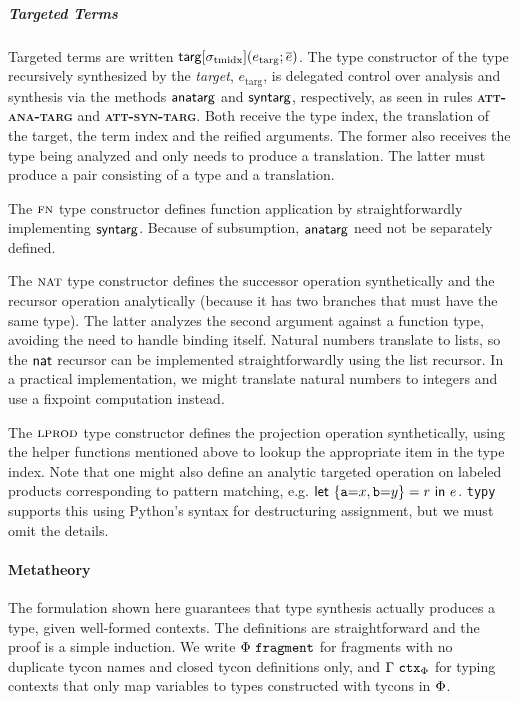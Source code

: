 \documentclass[preprint,10pt]{sigplanconf}
\newcommand{\sigmat}[1]{\sigma_{\text{#1}}}
\newcommand{\FF}[1]{{\sf #1}}
\newcommand{\rulename}[1]{{\textsc{\textbf{#1}}}}
\begin{document}
\subparagraph{Targeted Terms} Targeted terms are written $\FF{targ}[\sigmat{tmidx}](e_\text{targ}; \overline{e})$. The type constructor of the type recursively synthesized by the \emph{target}, $e_\text{targ}$, is delegated control over analysis and synthesis via the methods $\FF{anatarg}$ and $\FF{syntarg}$, respectively, as seen in rules \rulename{att-ana-targ} and \rulename{att-syn-targ}. Both receive the type index, the translation of the target, the term index and the reified arguments. The former also receives the type being analyzed and only needs to produce a translation. The latter must produce a pair consisting of a type and a translation.

The $\textsc{fn}$ type constructor defines function application by straightforwardly implementing $\FF{syntarg}$.  Because of subsumption, $\FF{anatarg}$ need not be separately defined.

The $\textsc{nat}$ type constructor defines the successor operation synthetically and the recursor operation analytically (because it has two branches that must have the same type). The latter analyzes the second argument against a function type, avoiding the need to handle binding itself. Natural numbers translate to lists, so the $\FF{nat}$ recursor can be implemented straightforwardly using the list recursor. In a practical implementation, we might translate natural numbers to integers and use a fixpoint computation instead.

The $\textsc{lprod}$ type constructor defines the projection operation synthetically, using the helper functions mentioned above to lookup the appropriate item in the type index. Note that one might also define an analytic targeted operation on labeled products corresponding to pattern matching, e.g. $\FF{let}~\{\texttt{a}{=}x, \texttt{b}{=}y\}=r~\FF{in}~e$. \verb|typy| supports this using Python's syntax for destructuring assignment, but we must omit the details.

\paragraph{Metatheory} The formulation shown here guarantees that type synthesis actually produces a type, given well-formed contexts. The definitions are straightforward and the proof is a simple induction. We write $\Phi~\mathtt{fragment}$ for fragments with no duplicate tycon names and closed tycon definitions only, and $\Gamma~\mathtt{ctx}_\Phi$ for typing contexts that only map variables to types constructed with tycons in $\Phi$. %
\end{document}
